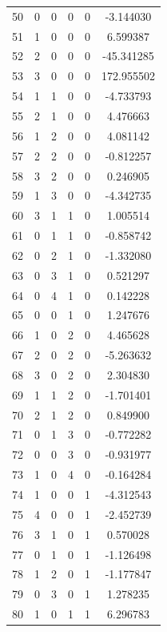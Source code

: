 \documentclass[preprint,12pt]{elsarticle}
\begin{document}
\begin{table}
\begin{minipage}[!h]{0.25\textwidth}
{\begin{tabular}{|c|cccc|c|}
50 &   0 &   0 &   0 &   0 &   -3.144030 \\
51 &   1 &   0 &   0 &   0 &    6.599387 \\
52 &   2 &   0 &   0 &   0 &  -45.341285 \\
53 &   3 &   0 &   0 &   0 &  172.955502 \\
54 &   1 &   1 &   0 &   0 &   -4.733793 \\
55 &   2 &   1 &   0 &   0 &    4.476663 \\
56 &   1 &   2 &   0 &   0 &    4.081142 \\
57 &   2 &   2 &   0 &   0 &   -0.812257 \\
58 &   3 &   2 &   0 &   0 &    0.246905 \\
59 &   1 &   3 &   0 &   0 &   -4.342735 \\
60 &   3 &   1 &   1 &   0 &    1.005514 \\
61 &   0 &   1 &   1 &   0 &   -0.858742 \\
62 &   0 &   2 &   1 &   0 &   -1.332080 \\
63 &   0 &   3 &   1 &   0 &    0.521297 \\
64 &   0 &   4 &   1 &   0 &    0.142228 \\
65 &   0 &   0 &   1 &   0 &    1.247676 \\
66 &   1 &   0 &   2 &   0 &    4.465628 \\
67 &   2 &   0 &   2 &   0 &   -5.263632 \\
68 &   3 &   0 &   2 &   0 &    2.304830 \\
69 &   1 &   1 &   2 &   0 &   -1.701401 \\
70 &   2 &   1 &   2 &   0 &    0.849900 \\
71 &   0 &   1 &   3 &   0 &   -0.772282 \\
72 &   0 &   0 &   3 &   0 &   -0.931977 \\
73 &   1 &   0 &   4 &   0 &   -0.164284 \\
74 &   1 &   0 &   0 &   1 &   -4.312543 \\
75 &   4 &   0 &   0 &   1 &   -2.452739 \\
76 &   3 &   1 &   0 &   1 &    0.570028 \\
77 &   0 &   1 &   0 &   1 &   -1.126498 \\
78 &   1 &   2 &   0 &   1 &   -1.177847 \\
79 &   0 &   3 &   0 &   1 &    1.278235 \\
80 &   1 &   0 &   1 &   1 &    6.296783 \\

\end{tabular}}
\end{minipage}
\end{table}
\end{document}

